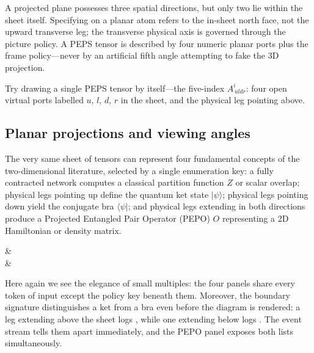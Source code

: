 \dbendpar A projected plane possesses three spatial directions, but only two
lie within the sheet itself.  Specifying  on a
planar atom refers to the in-sheet north face, not the upward transverse leg;
the transverse physical axis is governed through the picture policy.  A PEPS
tensor is described by four numeric planar ports plus the frame policy---never
by an artificial fifth angle attempting to fake the 3D projection.

 Try drawing a single PEPS tensor by itself---the
five-index $A^{i}_{\,uldr}$: four open virtual ports labelled $u$, $l$, $d$,
$r$ in the sheet, and the physical leg pointing above.

\subsection{Planar projections and viewing angles}

The very same sheet of tensors can represent four fundamental concepts of the
two-dimensional literature, selected by a single enumeration key: a fully
contracted network computes a classical partition function $Z$ or scalar
overlap; physical legs pointing up define the quantum ket state
$\lvert\psi\rangle$; physical legs pointing down yield the conjugate bra
$\langle\psi\rvert$; and physical legs extending in both directions produce a
Projected Entangled Pair Operator (PEPO) $O$ representing a 2D Hamiltonian or
density matrix.

\begin{tnmultiples}[
  formula={Z,\;\lvert\psi\rangle,\;\langle\psi\rvert,\;O},
  caption={one sheet, four readings},
  index={Left to right: no physical legs, a fully contracted scalar;
    legs up, the state; legs down, its conjugate; legs both ways, the
    PEPS operator.  The quoted signature is the legs-up panel's.},
  signature={kernel-boundary|signature=phys:n, phys:n, phys:n, phys:n},
  variants={{physical=none}{physical=none},
            {physical=up}{physical=up},
            {physical=down}{physical=down},
            {physical=updown}{physical=updown}}]
\begin{tenkz}[lattice={2x2}, frame=plane, variant]
  \tn{} & \tn{} \\
  \tn{} & \tn{}
\end{tenkz}
\end{tnmultiples}

Here again we see the elegance of small multiples: the four panels share every
token of input except the policy key beneath them.  Moreover, the boundary
signature distinguishes a ket from a bra even before the diagram is rendered: a
leg extending above the sheet logs , while one extending below
logs .  The event stream tells them apart immediately, and the
PEPO panel exposes both lists simultaneously.

